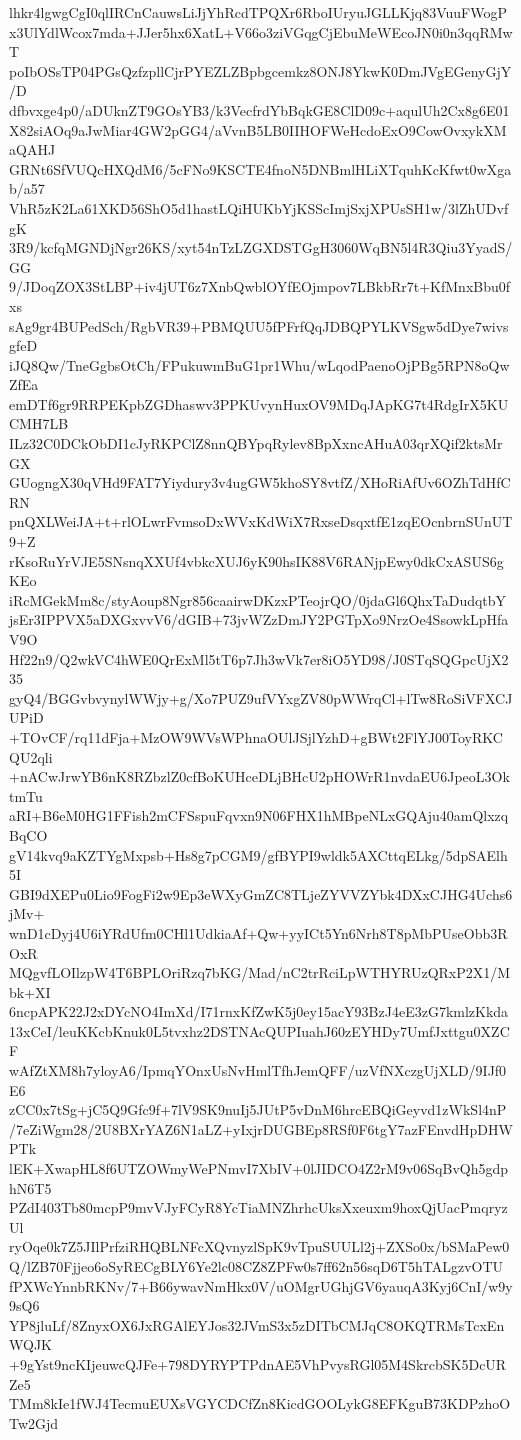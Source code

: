 lhkr4lgwgCgI0qlIRCnCauwsLiJjYhRcdTPQXr6RboIUryuJGLLKjq83VuuFWogP
x3UlYdlWcox7mda+JJer5hx6XatL+V66o3ziVGqgCjEbuMeWEcoJN0i0n3qqRMwT
poIbOSsTP04PGsQzfzpllCjrPYEZLZBpbgcemkz8ONJ8YkwK0DmJVgEGenyGjY/D
dfbvxge4p0/aDUknZT9GOsYB3/k3VecfrdYbBqkGE8ClD09c+aqulUh2Cx8g6E01
X82siAOq9aJwMiar4GW2pGG4/aVvnB5LB0IIHOFWeHcdoExO9CowOvxykXMaQAHJ
GRNt6SfVUQcHXQdM6/5cFNo9KSCTE4fnoN5DNBmlHLiXTquhKcKfwt0wXgab/a57
VhR5zK2La61XKD56ShO5d1hastLQiHUKbYjKSScImjSxjXPUsSH1w/3lZhUDvfgK
3R9/kcfqMGNDjNgr26KS/xyt54nTzLZGXDSTGgH3060WqBN5l4R3Qiu3YyadS/GG
9/JDoqZOX3StLBP+iv4jUT6z7XnbQwblOYfEOjmpov7LBkbRr7t+KfMnxBbu0fxs
sAg9gr4BUPedSch/RgbVR39+PBMQUU5fPFrfQqJDBQPYLKVSgw5dDye7wivsgfeD
iJQ8Qw/TneGgbsOtCh/FPukuwmBuG1pr1Whu/wLqodPaenoOjPBg5RPN8oQwZfEa
emDTf6gr9RRPEKpbZGDhaswv3PPKUvynHuxOV9MDqJApKG7t4RdgIrX5KUCMH7LB
ILz32C0DCkObDI1cJyRKPClZ8nnQBYpqRylev8BpXxncAHuA03qrXQif2ktsMrGX
GUogngX30qVHd9FAT7Yiydury3v4ugGW5khoSY8vtfZ/XHoRiAfUv6OZhTdHfCRN
pnQXLWeiJA+t+rlOLwrFvmsoDxWVxKdWiX7RxseDsqxtfE1zqEOcnbrnSUnUT9+Z
rKsoRuYrVJE5SNsnqXXUf4vbkcXUJ6yK90hsIK88V6RANjpEwy0dkCxASUS6gKEo
iRcMGekMm8c/styAoup8Ngr856caairwDKzxPTeojrQO/0jdaGl6QhxTaDudqtbY
jsEr3IPPVX5aDXGxvvV6/dGIB+73jvWZzDmJY2PGTpXo9NrzOe4SsowkLpHfaV9O
Hf22n9/Q2wkVC4hWE0QrExMl5tT6p7Jh3wVk7er8iO5YD98/J0STqSQGpcUjX235
gyQ4/BGGvbvynylWWjy+g/Xo7PUZ9ufVYxgZV80pWWrqCl+lTw8RoSiVFXCJUPiD
+TOvCF/rq11dFja+MzOW9WVsWPhnaOUlJSjlYzhD+gBWt2FlYJ00ToyRKCQU2qli
+nACwJrwYB6nK8RZbzlZ0cfBoKUHceDLjBHcU2pHOWrR1nvdaEU6JpeoL3OktmTu
aRI+B6eM0HG1FFish2mCFSspuFqvxn9N06FHX1hMBpeNLxGQAju40amQlxzqBqCO
gV14kvq9aKZTYgMxpsb+Hs8g7pCGM9/gfBYPI9wldk5AXCttqELkg/5dpSAElh5I
GBI9dXEPu0Lio9FogFi2w9Ep3eWXyGmZC8TLjeZYVVZYbk4DXxCJHG4Uchs6jMv+
wnD1cDyj4U6iYRdUfm0CHl1UdkiaAf+Qw+yyICt5Yn6Nrh8T8pMbPUseObb3ROxR
MQgvfLOIlzpW4T6BPLOriRzq7bKG/Mad/nC2trRciLpWTHYRUzQRxP2X1/Mbk+XI
6ncpAPK22J2xDYcNO4ImXd/I71rnxKfZwK5j0ey15acY93BzJ4eE3zG7kmlzKkda
13xCeI/leuKKcbKnuk0L5tvxhz2DSTNAcQUPIuahJ60zEYHDy7UmfJxttgu0XZCF
wAfZtXM8h7yloyA6/IpmqYOnxUsNvHmlTfhJemQFF/uzVfNXczgUjXLD/9IJf0E6
zCC0x7tSg+jC5Q9Gfc9f+7lV9SK9nuIj5JUtP5vDnM6hrcEBQiGeyvd1zWkSl4nP
/7eZiWgm28/2U8BXrYAZ6N1aLZ+yIxjrDUGBEp8RSf0F6tgY7azFEnvdHpDHWPTk
lEK+XwapHL8f6UTZOWmyWePNmvI7XbIV+0lJIDCO4Z2rM9v06SqBvQh5gdphN6T5
PZdI403Tb80mcpP9mvVJyFCyR8YcTiaMNZhrhcUksXxeuxm9hoxQjUacPmqryzUl
ryOqe0k7Z5JIlPrfziRHQBLNFcXQvnyzlSpK9vTpuSUULl2j+ZXSo0x/bSMaPew0
Q/lZB70Fjjeo6oSyRECgBLY6Ye2lc08CZ8ZPFw0s7ff62n56sqD6T5hTALgzvOTU
fPXWcYnnbRKNv/7+B66ywavNmHkx0V/uOMgrUGhjGV6yauqA3Kyj6CnI/w9y9sQ6
YP8jluLf/8ZnyxOX6JxRGAlEYJos32JVmS3x5zDITbCMJqC8OKQTRMsTcxEnWQJK
+9gYst9ncKIjeuwcQJFe+798DYRYPTPdnAE5VhPvysRGl05M4SkrcbSK5DcURZe5
TMm8kIe1fWJ4TecmuEUXsVGYCDCfZn8KicdGOOLykG8EFKguB73KDPzhoOTw2Gjd
